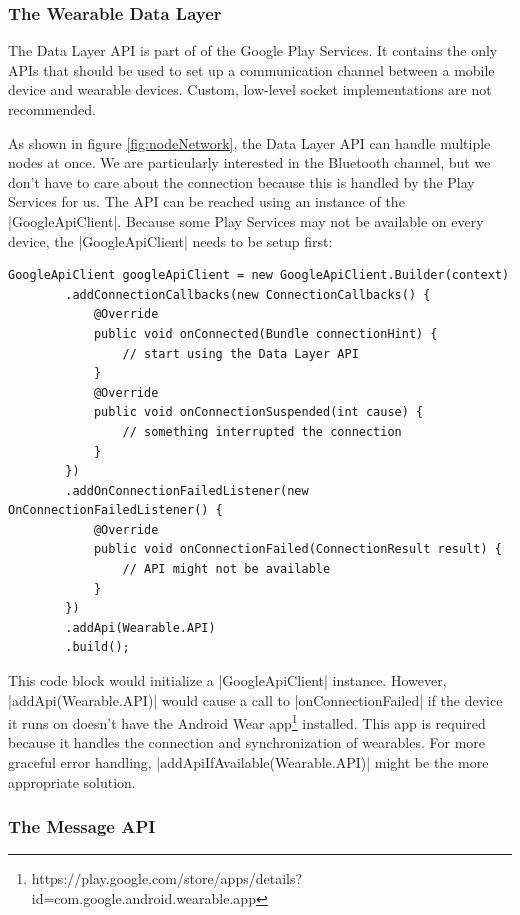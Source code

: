 \subsubsection{The Wearable Data Layer}

The Data Layer API is part of of the Google Play Services.
It contains the only APIs that should be used to set up a communication channel between a mobile device and wearable devices. 
Custom, low-level socket implementations are not recommended.

As shown in figure \ref{fig:nodeNetwork}, the Data Layer API can handle multiple nodes at once.
We are particularly interested in the Bluetooth channel, but we don't have to care about the connection because this is handled by the Play Services for us.
The API can be reached using an instance of the |GoogleApiClient|\cite{androiddocs:googleapiclient}.
Because some Play Services may not be available on every device, the |GoogleApiClient| needs to be setup first:

\begin{lstlisting}[label=googleapiclient]
GoogleApiClient googleApiClient = new GoogleApiClient.Builder(context)
		.addConnectionCallbacks(new ConnectionCallbacks() {
			@Override
			public void onConnected(Bundle connectionHint) {
				// start using the Data Layer API
			}
			@Override
			public void onConnectionSuspended(int cause) {
				// something interrupted the connection
			}
		})
		.addOnConnectionFailedListener(new OnConnectionFailedListener() {
			@Override
			public void onConnectionFailed(ConnectionResult result) {
				// API might not be available
			}
		})
		.addApi(Wearable.API)
		.build();
\end{lstlisting}

\clearpage

This code block would initialize a |GoogleApiClient| instance.
However, \\|addApi(Wearable.API)| would cause a call to |onConnectionFailed| if the device it runs on doesn't have the Android Wear app\footnote{https://play.google.com/store/apps/details?id=com.google.android.wearable.app} installed.
This app is required because it handles the connection and synchronization of wearables.
For more graceful error handling, |addApiIfAvailable(Wearable.API)| might be the more appropriate solution.

\subsubsection{The Message API}

